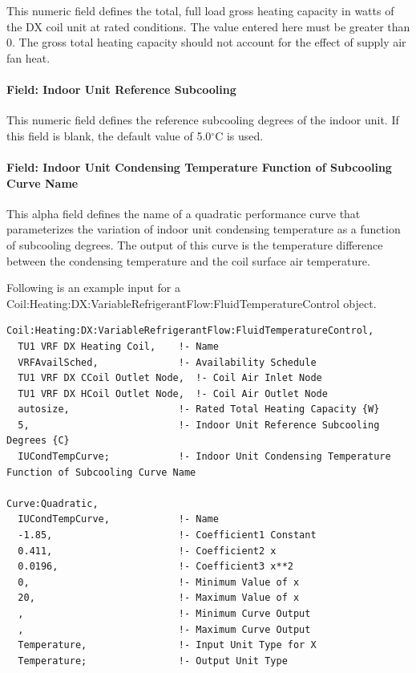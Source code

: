 This numeric field defines the total, full load gross heating capacity in watts of the DX coil unit at rated conditions. The value entered here must be greater than 0. The gross total heating capacity should not account for the effect of supply air fan heat.

\paragraph{Field: Indoor Unit Reference Subcooling}\label{field-indoor-unit-reference-subcooling}

This numeric field defines the reference subcooling degrees of the indoor unit. If this field is blank, the default value of 5.0$^\circ$C is used.

\paragraph{Field: Indoor Unit Condensing Temperature Function of Subcooling Curve Name}\label{field-indoor-unit-condensing-temperature-function-of-subcooling-curve-name}

This alpha field defines the name of a quadratic performance curve that parameterizes the variation of indoor unit condensing temperature as a function of subcooling degrees. The output of this curve is the temperature difference between the condensing temperature and the coil surface air temperature.

Following is an example input for a Coil:Heating:DX:VariableRefrigerantFlow:FluidTemperatureControl object.

\begin{lstlisting}
Coil:Heating:DX:VariableRefrigerantFlow:FluidTemperatureControl,
  TU1 VRF DX Heating Coil,    !- Name
  VRFAvailSched,              !- Availability Schedule
  TU1 VRF DX CCoil Outlet Node,  !- Coil Air Inlet Node
  TU1 VRF DX HCoil Outlet Node,  !- Coil Air Outlet Node
  autosize,                   !- Rated Total Heating Capacity {W}
  5,                          !- Indoor Unit Reference Subcooling Degrees {C}
  IUCondTempCurve;            !- Indoor Unit Condensing Temperature Function of Subcooling Curve Name

Curve:Quadratic,
  IUCondTempCurve,            !- Name
  -1.85,                      !- Coefficient1 Constant
  0.411,                      !- Coefficient2 x
  0.0196,                     !- Coefficient3 x**2
  0,                          !- Minimum Value of x
  20,                         !- Maximum Value of x
  ,                           !- Minimum Curve Output
  ,                           !- Maximum Curve Output
  Temperature,                !- Input Unit Type for X
  Temperature;                !- Output Unit Type
\end{lstlisting}

